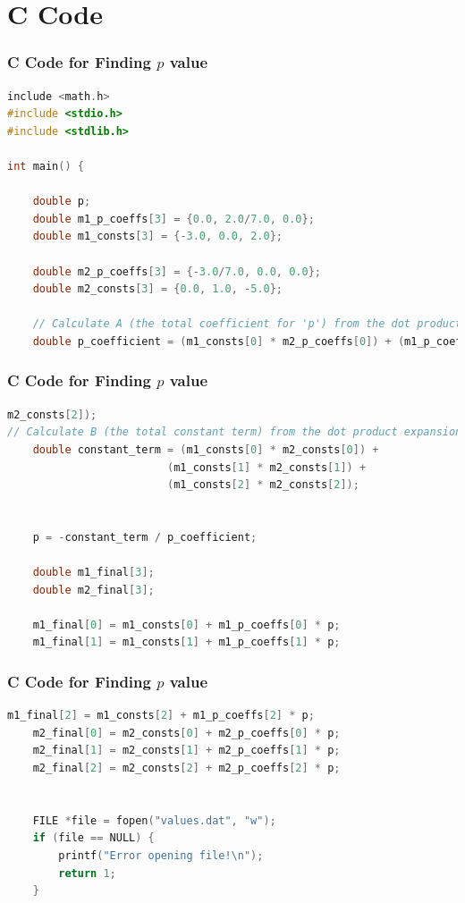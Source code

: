 \documentclass{beamer}
\theoremstyle{remark}
\numberwithin{equation}{section}
\begin{document}
\section{C Code}
\begin{frame}[fragile]
\frametitle{C Code for Finding $p$ value}
\begin{lstlisting}[language=C]
include <math.h>
#include <stdio.h>
#include <stdlib.h>

int main() {

    double p;
    double m1_p_coeffs[3] = {0.0, 2.0/7.0, 0.0};
    double m1_consts[3] = {-3.0, 0.0, 2.0};

    double m2_p_coeffs[3] = {-3.0/7.0, 0.0, 0.0};
    double m2_consts[3] = {0.0, 1.0, -5.0};
    
    // Calculate A (the total coefficient for 'p') from the dot product expansion.
    double p_coefficient = (m1_consts[0] * m2_p_coeffs[0]) + (m1_p_coeffs[0] * m2_consts[0]) +(m1_consts[1] * m2_p_coeffs[1]) + (m1_p_coeffs[1] * m2_consts[1]) + (m1_consts[2] * m2_p_coeffs[2]) + (m1_p_coeffs[2] * 
    \end{lstlisting}
\end{frame}
\begin{frame}[fragile]
\frametitle{C Code for Finding $p$ value}
\begin{lstlisting}[language=C]
  m2_consts[2]);
// Calculate B (the total constant term) from the dot product expansion.
    double constant_term = (m1_consts[0] * m2_consts[0]) +
                         (m1_consts[1] * m2_consts[1]) +
                         (m1_consts[2] * m2_consts[2]);


    p = -constant_term / p_coefficient;

    double m1_final[3];
    double m2_final[3];

    m1_final[0] = m1_consts[0] + m1_p_coeffs[0] * p;
    m1_final[1] = m1_consts[1] + m1_p_coeffs[1] * p;
\end{lstlisting}
\end{frame}

\begin{frame}[fragile]
\frametitle{C Code for Finding $p$ value}
\begin{lstlisting}[language=C]
     m1_final[2] = m1_consts[2] + m1_p_coeffs[2] * p;
    m2_final[0] = m2_consts[0] + m2_p_coeffs[0] * p;
    m2_final[1] = m2_consts[1] + m2_p_coeffs[1] * p;
    m2_final[2] = m2_consts[2] + m2_p_coeffs[2] * p;


    FILE *file = fopen("values.dat", "w");
    if (file == NULL) {
        printf("Error opening file!\n");
        return 1;
    }

\end{lstlisting}
\end{frame}
\end{document}
